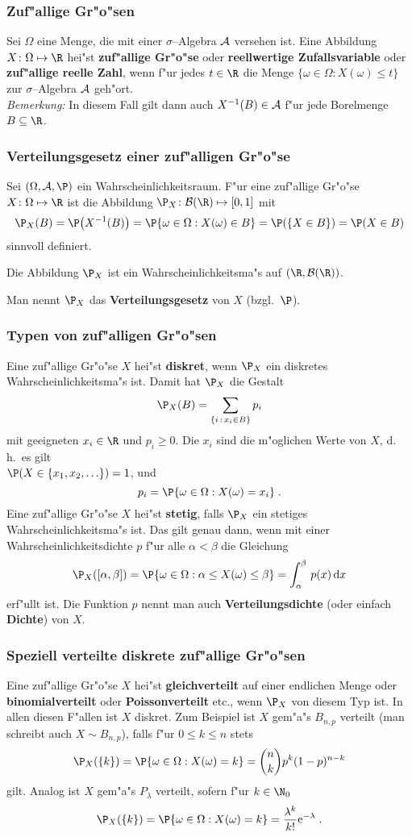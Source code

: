 \subsubsection{Zuf"allige Gr"o"sen}
Sei $\Omega$ eine Menge, die mit einer $\sigma$--Algebra $\mathcal A$ versehen ist. Eine Abbildung
$X\colon\Omega\mapsto\R$ hei"st \textbf{zuf"allige Gr"o"se} oder \textbf{reellwertige Zufallsvariable}
oder \textbf{zuf"allige reelle Zahl}, wenn f"ur jedes $t\in\R$ die Menge $\{\omega\in\Omega: X(\omega)\le t\}$
zur $\sigma$--Algebra $\mathcal A$ geh"ort.\\
\textit{Bemerkung:} In diesem Fall gilt dann auch $X^{-1}(B)\in\mathcal A$ f"ur jede Borelmenge $B\subseteq \R$.

\subsubsection{Verteilungsgesetz einer zuf"alligen Gr"o"se}
Sei $(\Omega,\fr A,\P)$ ein Wahrscheinlichkeitsraum.
F"ur eine zuf"allige Gr"o"se $X\colon\Omega\mapsto\R$ ist die Abbildung
$\P_X \colon \fr B(\R)\mapsto [0,1]$ mit
$$
\P_X(B)=\P\big(X^{-1}(B)\big)=\P\{\omega\in\Omega : X(\omega)\in B\}=\P(\{X\in B\})= \P(X\in B)
$$
sinnvoll definiert.
\begin{thm}
Die Abbildung $\P_X$ ist ein Wahrscheinlichkeitsma"s auf $(\R,\fr B(\R))$.
\end{thm}
Man nennt $\P_X$ das \textbf{Verteilungsgesetz} von $X$ (bzgl.~$\P$).
\subsubsection{Typen von zuf"alligen Gr"o"sen}
Eine zuf"allige Gr"o"se $X$ hei"st \textbf{diskret}, wenn $\P_X$ ein diskretes
Wahrscheinlichkeitsma"s ist. Damit hat $\P_X$ die Gestalt
$$
\P_X(B)=\sum_{\{i\, : \,x_i\in  B\}} p_i
$$
mit geeigneten $x_i\in\R$ und $p_i\ge 0$. Die $x_i$ sind die m"oglichen Werte von $X$, d.\,h.~es
gilt\\ $\P(X\in\{x_1,x_2,\ldots\})=1$,
und
$$
p_i=\P\{\omega\in\Omega : X(\omega)=x_i\}\;.
$$
Eine zuf"allige Gr"o"se $X$ hei"st \textbf{stetig}, falls $\P_X$ ein stetiges Wahrscheinlichkeitsma"s
ist. Das gilt genau dann, wenn mit einer Wahrscheinlichkeitsdichte $p$ f"ur alle $\alpha<\beta$
die Gleichung
$$
\P_X([\alpha,\beta])=\P\{\omega\in\Omega : \alpha\le X(\omega)\le\beta\}=\int_\alpha^\beta\,p(x)\,
\mathrm d x
$$
erf"ullt ist. Die Funktion $p$ nennt man auch \textbf{Verteilungsdichte} (oder einfach
\textbf{Dichte}) von $X$.
\subsubsection{Speziell verteilte diskrete zuf"allige Gr"o"sen}
Eine zuf"allige Gr"o"se $X$ hei"st \textbf{gleichverteilt}
 auf einer endlichen Menge oder \textbf{binomialverteilt}
oder \textbf{Poissonverteilt} etc., wenn $\P_X$ von diesem Typ ist. In allen diesen F"allen
ist $X$ diskret. Zum Beispiel ist $X$ gem"a"s $B_{n,p}$ verteilt (man schreibt auch
$X\sim B_{n,p}$), falls f"ur $0\le k\le n$ stets
$$
\P_X(\{k\})=\P\{\omega\in\Omega : X(\omega)=k\} = {n \choose k} p^k(1-p)^{n-k}
$$
gilt. Analog ist $X$ gem"a"s $P_\lambda$ verteilt, sofern f"ur $k\in\N_0$
$$
\P_X(\{k\})=\P\{\omega\in\Omega : X(\omega)=k\}=\frac{\lambda^k}{k!}\mathrm e^{-\lambda}\;.
$$
